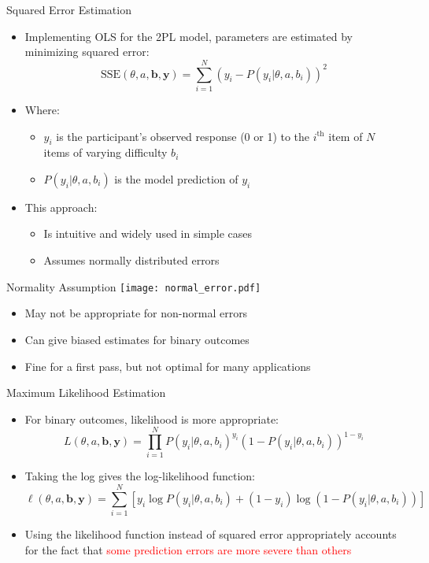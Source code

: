\documentclass[aspectratio=169]{beamer}
\renewcommand{\emph}[1]{\textcolor{red}{#1}}
\begin{document}
\begin{frame}{Squared Error Estimation}
  \begin{itemize}[<+->]
    \item Implementing OLS for the 2PL model, parameters are estimated by minimizing squared error:
    \begin{equation}
      \text{SSE}(\theta,a,\mathbf{b},\mathbf{y}) = \sum_{i=1}^{N} (y_i - P(y_i|\theta,a,b_i))^2
    \end{equation}
    \item Where:
    \begin{itemize}[<+->]
      \item $y_i$ is the participant's observed response (0 or 1) to the $i^\text{th}$ item of $N$ items of varying difficulty $b_i$
      \item $P(y_i|\theta,a,b_i)$ is the model prediction of $y_i$
    \end{itemize}
    \item This approach:
    \begin{itemize}[<+->]
      \item Is intuitive and widely used in simple cases
      \item Assumes normally distributed errors
    \end{itemize}
  \end{itemize}
\end{frame}

\begin{frame}{Normality Assumption}
  \centering
  \texttt{[image: normal\_error.pdf]}
  
  \begin{itemize}[<+->]
    \item May not be appropriate for non-normal errors
    \item Can give biased estimates for binary outcomes
    \item Fine for a first pass, but not optimal for many applications
  \end{itemize}
\end{frame}

\begin{frame}{Maximum Likelihood Estimation}
  \begin{itemize}[<+->]
    \item For binary outcomes, likelihood is more appropriate:
    \begin{equation}
      L(\theta,a,\mathbf{b},\mathbf{y}) = \prod_{i=1}^{N} P(y_i|\theta,a,b_i)^{y_i} (1 - P(y_i|\theta,a,b_i))^{1-y_i}
    \end{equation}
    \item Taking the log gives the log-likelihood function:
    \begin{equation}
      \ell(\theta,a,\mathbf{b},\mathbf{y}) = \sum_{i=1}^{N} \left[y_i \log P(y_i|\theta,a,b_i) + (1-y_i) \log(1 - P(y_i|\theta,a,b_i))\right]
    \end{equation}
    \item Using the likelihood function instead of squared error appropriately accounts for the fact that \emph{some prediction errors are more severe than others}
  \end{itemize}
\end{frame}
\end{document}
